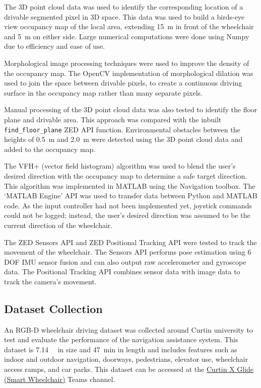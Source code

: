 The 3D point cloud data was used to identify the corresponding location of a drivable segmented pixel in 3D space.
This data was used to build a birds-eye view occupancy map of the local area, extending \SI{15}{\metre}
in front of the wheelchair and \SI{5}{\metre} on either side.
Large numerical computations were done using Numpy due to efficiency and ease of use.

Morphological image processing techniques were used to improve the density of the occupancy map.
The OpenCV \cite{bradskiOpenCVLibrary2000} implementation of morphological dilation was used to
join the space between drivable pixels, to create a continuous driving surface in the occupancy map
rather than many separate pixels.

Manual processing of the 3D point cloud data was also tested to identify the floor plane and drivable area.
This approach was compared with the inbuilt \texttt{find\_floor\_plane} ZED API function.
Environmental obstacles between the heights of \SI{0.5}{\metre} and \SI{2.0}{\metre} were
detected using the 3D point cloud data and added to the occupancy map.

The VFH+ (vector field histogram) algorithm \cite{ulrichVFHReliableObstacle1998} was used to blend
the user's desired direction with the occupancy map to determine a safe target direction.
This algorithm was implemented in MATLAB using the Navigation toolbox. The `MATLAB Engine' API
was used to transfer data between Python and MATLAB code.
As the input controller had not been implemented yet, joystick commands could not be logged; instead,
the user's desired direction was assumed to be the current direction of the wheelchair.

The ZED Sensors API and ZED Positional Tracking API were tested to track the movement of the wheelchair.
The Sensors API performs pose estimation using 6 DOF IMU sensor fusion and can also output raw accelerometer
and gyroscope data. The Positional Tracking API combines sensor data with image data to track the camera's movement.

\subsection{Dataset Collection}
An RGB-D wheelchair driving dataset was collected around Curtin university
to test and evaluate the performance of the navigation assistance system.
This dataset is \SI{7.14}{\giga\byte} in size and \SI{47}{\minute} in length
and includes features such as indoor and outdoor navigation, doorways, pedestrians,
elevator use, wheelchair access ramps, and car parks. This dataset can be accessed at the
\href{https://curtin.sharepoint.com/:f:/r/sites/CurtinXGlide/Shared%20Documents/Navigation%20and%20Object%20Detection/ZED?csf=1&web=1&e=tTau9D}{\underline{Curtin X Glide (Smart Wheelchair)}} Teams channel.

